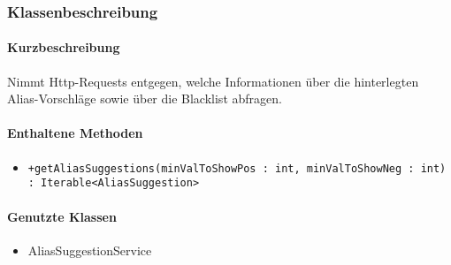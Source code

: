 \subsubsection*{Klassenbeschreibung}%
\paragraph*{Kurzbeschreibung}
Nimmt Http-Requests entgegen, welche Informationen über die hinterlegten Alias-Vorschläge sowie über die Blacklist abfragen.
\paragraph*{Enthaltene Methoden}
\begin{itemize}
    \item \texttt{+getAliasSuggestions(minValToShowPos : int, minValToShowNeg : int) : Iterable<AliasSuggestion>}
\end{itemize}
\paragraph*{Genutzte Klassen}
\begin{itemize}
    \item AliasSuggestionService
\end{itemize}
